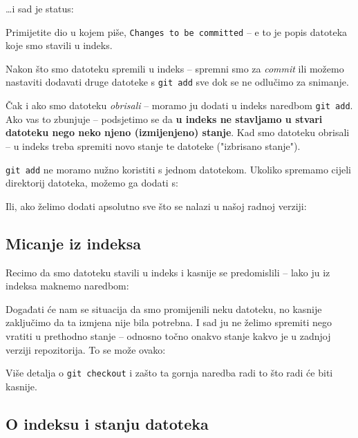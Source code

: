 
\dots{}i sad je status:



Primijetite dio u kojem piše, \verb+Changes to be committed+ -- e to je popis datoteka koje smo stavili u indeks.

Nakon što smo datoteku spremili u indeks -- spremni smo za \emph{commit} ili možemo nastaviti dodavati druge datoteke s \verb+git add+ sve dok se ne odlučimo za snimanje.

Čak i ako smo datoteku \emph{obrisali} -- moramo ju dodati u indeks naredbom \verb+git add+.
Ako vas to zbunjuje -- podsjetimo se da \textbf{u indeks ne stavljamo u stvari datoteku nego neko njeno (izmijenjeno) stanje}.
Kad smo datoteku obrisali -- u indeks treba spremiti novo stanje te datoteke ("izbrisano stanje").

\verb+git add+ ne moramo nužno koristiti s jednom datotekom.
Ukoliko spremamo cijeli direktorij datoteka, možemo ga dodati s:


Ili, ako želimo dodati apsolutno sve što se nalazi u našoj radnoj verziji:


\subsection*{Micanje iz indeksa}

Recimo da smo datoteku stavili u indeks i kasnije se predomislili -- lako ju iz indeksa maknemo naredbom:


Događati će nam se situacija da smo promijenili neku datoteku, no kasnije zaključimo da ta izmjena nije bila potrebna. 
I sad ju ne želimo spremiti nego vratiti u prethodno stanje -- odnosno točno onakvo stanje kakvo je u zadnjoj verziji repozitorija.
To se može ovako:


Više detalja o \verb+git checkout+ i zašto ta gornja naredba radi to što radi će biti kasnije.

\subsection*{O indeksu i stanju datoteka}

